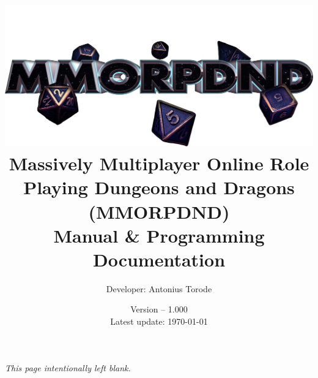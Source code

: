 \documentclass[openany,a4paper,10pt]{book}
\title{\vspace{0.1cm}  \includegraphics[scale=0.18]{./images/man_cover.png} \vspace{.5cm} \\ Massively Multiplayer Online Role Playing Dungeons and Dragons (MMORPDND) \\  Manual \& Programming Documentation}
\author{Developer: Antonius Torode}
\date{Version -- 1.000 \\ Latest update: \today}
\begin{document}
\frontmatter
\maketitle

\tableofcontents
\newpage
\vspace*{\fill}
\begin{center}
	\textit{This page intentionally left blank.}
\end{center}
\vspace*{\fill}

\mainmatter
\pagestyle{fancy}
\fancyhf{}
\fancyhead[RO, LE]{\thepage}










\backmatter


\printindex
\end{document}
